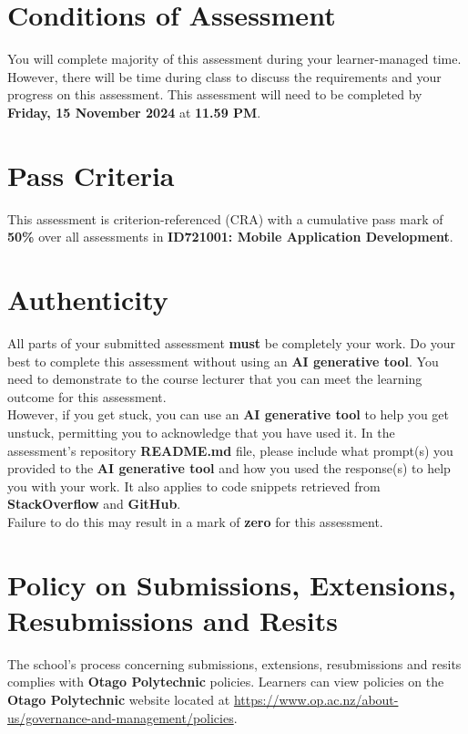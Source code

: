 \documentclass{article}
\begin{document}
\section*{Conditions of Assessment}
You will complete majority of this assessment during your learner-managed time. However, there will be time during class to discuss the requirements and your progress on this assessment. This assessment will need to be completed by \textbf{Friday, 15 November 2024} at \textbf{11.59 PM}.

\section*{Pass Criteria}
This assessment is criterion-referenced (CRA) with a cumulative pass mark of \textbf{50\%} over all assessments in \textbf{ID721001: Mobile Application Development}.

\section*{Authenticity}
All parts of your submitted assessment \textbf{must} be completely your work. Do your best to complete this assessment without using an \textbf{AI generative tool}. You need to demonstrate to the course lecturer that you can meet the learning outcome for this assessment. \\
 
 However, if you get stuck, you can use an \textbf{AI generative tool} to help you get unstuck, permitting you to acknowledge that you have used it. In the assessment's repository \textbf{README.md} file, please include what prompt(s) you provided to the \textbf{AI generative tool} and how you used the response(s) to help you with your work. It also applies to code snippets retrieved from \textbf{StackOverflow} and \textbf{GitHub}. \\
 
 Failure to do this may result in a mark of \textbf{zero} for this assessment.

\section*{Policy on Submissions, Extensions, Resubmissions and Resits}
The school's process concerning submissions, extensions, resubmissions and resits complies with \textbf{Otago Polytechnic} policies. Learners can view policies on the \textbf{Otago Polytechnic} website located at \href{https://www.op.ac.nz/about-us/governance-and-management/policies}{https://www.op.ac.nz/about-us/governance-and-management/policies}.
\end{document}
